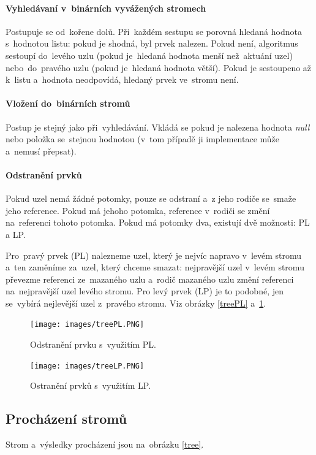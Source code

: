 \paragraph{Vyhledávaní v~binárních vyvážených stromech} Postupuje se od~kořene dolů. Při~každém sestupu se porovná hledaná hodnota s~hodnotou listu: pokud je shodná, byl prvek nalezen. Pokud není, algoritmus sestoupí do~levého uzlu (pokud je~hledaná hodnota menší než~aktuání uzel) nebo~do~pravého uzlu (pokud je~hledaná hodnota větší). Pokud je sestoupeno až k~listu a~hodnota neodpovídá, hledaný prvek ve~stromu není.

\paragraph{Vložení do~binárních stromů} Postup je stejný jako při~vyhledávání. Vkládá se pokud je nalezena hodnota \emph{null} nebo položka se~stejnou hodnotou (v~tom případě ji implementace může a~nemusí přepsat).

\paragraph{Odstranění prvků} Pokud uzel nemá žádné potomky, pouze se odstraní a~z jeho rodiče se~smaže jeho reference. Pokud má jehoho potomka, reference v~rodiči se změní na~referenci tohoto potomka. Pokud má potomky dva, existují dvě možnosti: PL a LP.

Pro~pravý prvek (PL) nalezneme uzel, který je nejvíc napravo v~levém stromu a~ten zaměníme za~uzel, který chceme smazat: nejpravější uzel v~levém stromu převezme referenci ze~mazaného uzlu a~rodič mazaného uzlu změní referenci na~nejpravější uzel levého stromu. Pro levý prvek (LP) je to podobné, jen se~vybírá nejlevější uzel z~pravého stromu. Viz obrázky \ref{treePL} a~\ref{treeLP}.

\begin{figure}[ht]
	\centering
	\texttt{[image: images/treePL.PNG]}
	\caption{Odstranění prvku s~využitím PL.}
	\label{treePL}

	\texttt{[image: images/treeLP.PNG]}
	\caption{Ostranění prvků s~využitím LP.}
	\label{treeLP}
\end{figure}

\subsection{Procházení stromů}

Strom a~výsledky procházení jsou na~obrázku \ref{tree}.

